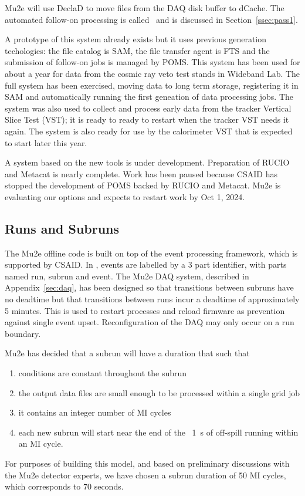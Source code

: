 Mu2e will use DeclaD to move files from the DAQ disk buffer to dCache.
The automated follow-on processing is called \passone\ and is discussed in Section~\ref{ssec:pass1}.

A prototype of this system already exists but it uses previous generation techologies: the file catalog is SAM, the file transfer agent is FTS and the submission of follow-on jobs is managed by POMS.  This system has been used for about a year for data from the cosmic ray veto test stands in Wideband Lab.  The full system has been exercised, moving data to long term storage, registering it in SAM and automatically running the first geneation of data processing jobs.  The system was also used to collect and process early data from the tracker Vertical Slice Test (VST);  it is ready to ready to restart when the tracker VST needs it again.
The system is also ready for use by the calorimeter VST that is expected to start later this year.

A system based on the new tools is under development. Preparation of RUCIO and Metacat is nearly complete.  Work has been paused because CSAID has stopped the development of POMS backed by RUCIO and Metacat.  Mu2e is evaluating our options and expects to restart work by Oct 1, 2024.

\subsection{Runs and Subruns}
\label{ssec:datahandling:runsSubruns}

The Mu2e offline code is built on top of the \art event processing framework, which is supported by CSAID.  
In \art, events are labelled by a 3 part identifier, with parts named run, subrun and event.  The Mu2e DAQ system, described in Appendix~\ref{sec:daq}, has been designed so that transitions between subruns have no deadtime but that transitions between runs incur a deadtime of approximately 5 minutes.  This is used to restart processes and reload firmware as prevention against single event upset.   Reconfiguration of the DAQ may only occur on a run boundary.

Mu2e has decided that a subrun will have a duration that such that
\begin{enumerate}
    \item conditions are constant throughout the subrun
    \item the output data files are small enough to be processed within a single grid job
    \item it contains an integer number of MI cycles
    \item each new subrun will start near the end of the ~1~s of off-spill running within an MI cycle. 
\end{enumerate}
For purposes of building this model, and based on preliminary discussions with the Mu2e detector experts, we have chosen a subrun duration of 50 MI cycles, which corresponds to 70 seconds.

